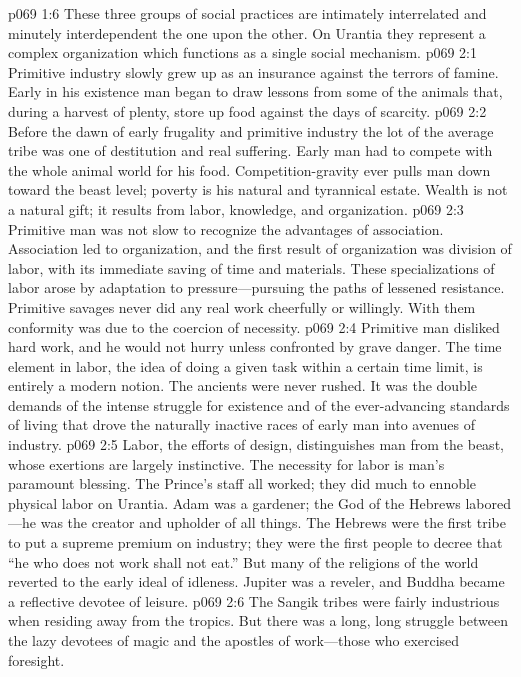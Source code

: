 \pc \vs p069 1:6 These three groups of social practices are intimately interrelated and minutely interdependent the one upon the other. On Urantia they represent a complex organization which functions as a single social mechanism.
\vs p069 2:1 Primitive industry slowly grew up as an insurance against the terrors of famine. Early in his existence man began to draw lessons from some of the animals that, during a harvest of plenty, store up food against the days of scarcity.
\vs p069 2:2 Before the dawn of early frugality and primitive industry the lot of the average tribe was one of destitution and real suffering. Early man had to compete with the whole animal world for his food. Competition\hyp{}gravity ever pulls man down toward the beast level; poverty is his natural and tyrannical estate. Wealth is not a natural gift; it results from labor, knowledge, and organization.
\vs p069 2:3 Primitive man was not slow to recognize the advantages of association. Association led to organization, and the first result of organization was division of labor, with its immediate saving of time and materials. These specializations of labor arose by adaptation to pressure---pursuing the paths of lessened resistance. Primitive savages never did any real work cheerfully or willingly. With them conformity was due to the coercion of necessity.
\vs p069 2:4 Primitive man disliked hard work, and he would not hurry unless confronted by grave danger. The time element in labor, the idea of doing a given task within a certain time limit, is entirely a modern notion. The ancients were never rushed. It was the double demands of the intense struggle for existence and of the ever\hyp{}advancing standards of living that drove the naturally inactive races of early man into avenues of industry.
\vs p069 2:5 Labor, the efforts of design, distinguishes man from the beast, whose exertions are largely instinctive. The necessity for labor is man’s paramount blessing. The Prince’s staff all worked; they did much to ennoble physical labor on Urantia. Adam was a gardener; the God of the Hebrews labored---he was the creator and upholder of all things. The Hebrews were the first tribe to put a supreme premium on industry; they were the first people to decree that “he who does not work shall not eat.” But many of the religions of the world reverted to the early ideal of idleness. Jupiter was a reveler, and Buddha became a reflective devotee of leisure.
\vs p069 2:6 The Sangik tribes were fairly industrious when residing away from the tropics. But there was a long, long struggle between the lazy devotees of magic and the apostles of work---those who exercised foresight.
